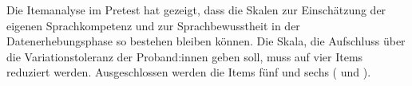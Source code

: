 Die Itemanalyse im Pretest hat gezeigt, dass die Skalen zur Einschätzung der eigenen Sprachkompetenz und zur Sprachbewusstheit in der Datenerhebungsphase so bestehen bleiben können. Die Skala, die Aufschluss über die Variationstoleranz der Proband:innen geben soll, muss auf vier Items reduziert werden. Ausgeschlossen werden die Items fünf und sechs ( und ).
